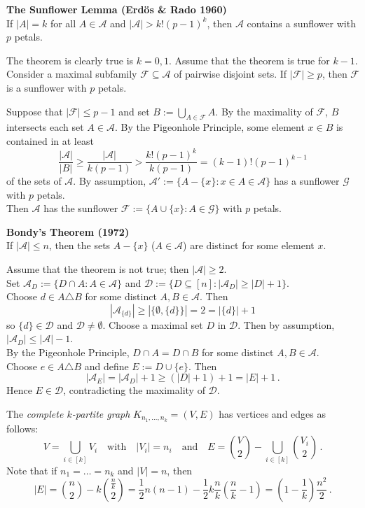 \documentclass[a4paper]{article}
\let\oldendproof\endproof
\renewenvironment{proof}[1][\proofname]{%
  \oldproof[\scshape \noindent {\bfseries \text{Proof}}]%
}{\oldendproof}
\newcommand{\definition}{\bigskip\noindent{\bf Definition.}\;\;}
\newenvironment{thm}[1]{
	\begin{framed}
	\noindent
	{\bfseries #1}\\}{\setlength{\itemsep}{0pt}
	\end{framed}
}
\newcommand{\Af}{\mathcal{A}}
\newcommand{\Df}{\mathcal{D}}
\newcommand{\Ff}{\mathcal{F}}
\newcommand{\Gf}{\mathcal{G}}
\begin{document}
\begin{thm}{The Sunflower Lemma (Erd\"os \& Rado 1960)}
If $|A| = k$ for all $A \in \Af$ and $|\Af| > k!(p-1)^k$,
then $\Af$ contains a sunflower with $p$ petals.
\end{thm}

\begin{proof}
The theorem is clearly true is $k=0,1$.
Assume that the theorem is true for $k-1$.
Consider a maximal subfamily $\Ff \subseteq \Af$ of pairwise disjoint sets.
If $|\Ff| \geq p$, then $\Ff$ is a sunflower with $p$ petals.

Suppose that $|\Ff| \leq p-1$ and set $B:= \bigcup_{A \in \Ff} A$.
By the maximality of $\Ff$, $B$ intersects each set $A \in \Af$.
By the Pigeonhole Principle, some element $x \in B$ is contained in at least
	\[ \frac{|\Af|}{|B|} \geq \frac{|\Af|}{k(p-1)} > \frac{k! (p-1)^k}{k(p-1)} = (k-1)!(p-1)^{k-1}\]
of the sets of $\Af$.
By assumption, $\Af':= \{A - \{x\} : x \in A \in \Af\}$ has a sunflower $\Gf$ with $p$ petals.\\
Then $\Af$ has the sunflower $\Ff:= \{A \cup\{x\} : A \in \Gf\}$ with $p$ petals.
\end{proof}

\begin{thm}{Bondy's Theorem (1972)}
If $|\Af| \leq n$, then the sets $A - \{x\}$ ($A \in \Af$) are distinct for some element $x$.
\end{thm}

\begin{proof}
Assume that the theorem is not true; then $|\Af| \geq 2$.\\
Set $\Af_D:= \{D \cap A: A \in \Af\}$ and $\Df := \{D \subseteq [n] : |\Af_D| \geq |D| +1\}$.\\
Choose $d \in A \triangle B$ for some distinct $A, B \in \Af$.
Then
	\[ |\Af_{\{d\}}| \geq |\{\emptyset, \{d\}\}| =2 = |\{d\}| +1\]
so $\{d\} \in \Df$ and $\Df \neq \emptyset$.
Choose a maximal set $D$ in $\Df$.
Then by assumption, $|\Af_D| \leq |\Af| - 1$.\\
By the Pigeonhole Principle,
$D \cap A = D \cap B$ for some distinct $A, B \in \Af$.\\
Choose $e \in A\triangle B$ and define $E:=D \cup \{e\}$.
Then
\[|\Af_E| = |\Af_D| + 1 \geq (|D|+1)+1=|E|+1\,.\]
Hence $E \in \Df$, contradicting the maximality of $\Df$.
\end{proof}

\definition
The \emph{complete $k$-partite graph} $K_{n_1, \dots, n_k} = (V,E)$ has
vertices and edges as follows:
\[
  V = \bigcup_{i \in [k]} V_i\quad\text{with}\quad|V_i| = n_i
   \quad\text{and}\quad
  E = \binom{V}{2} - \bigcup_{i \in [k]} \binom{V_i}{2}\,.
\]
Note that if $n_1 = \dots = n_k$ and $|V| = n$, then
	\[ |E| = \binom{n}{2} - k \binom{\frac{n}{k}}{2} = \frac{1}{2} n (n-1) - \frac{1}{2} k
\frac{n}{k} \left(\frac{n}{k} - 1\right) = \left(1- \frac{1}{k}\right) \frac{n^2}{2}\,.\]
\end{document}
